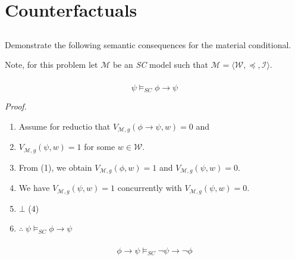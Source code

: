 \documentclass{article}
\begin{document}
    \section{Counterfactuals}
    
        \subsection{}
        \begin{task}
            Demonstrate the following semantic consequences for the material conditional.
        \end{task}

        Note, for this problem let $\mathscr{M}$ be an \textit{SC} model such that $\mathscr{M} = \langle \mathscr{W}, \preceq , \mathscr{I} \rangle$.


            \subsubsection{}
            $$\psi \vDash_{SC} \phi \rightarrow \psi$$

            \textit{Proof.}
            \begin{enumerate}
                \item Assume for reductio that $V_{\mathscr{M}, g}(\phi \rightarrow \psi, w) = 0$ and
                \item $V_{\mathscr{M}, g}(\psi, w) = 1$ for some $w \in \mathscr{W}$.
                \item From (1), we obtain $V_{\mathscr{M}, g}(\phi, w) = 1$ and $V_{\mathscr{M}, g}(\psi, w) = 0$.
                \item We have $V_{\mathscr{M}, g}(\psi, w) = 1$ concurrently with $V_{\mathscr{M}, g}(\psi, w) = 0$. 
                \item $\bot$ (4)
                \item $\therefore \; \psi \vDash_{SC} \phi \rightarrow \psi$
            \end{enumerate}

            \subsubsection{}
            $$\phi \rightarrow \psi \vDash_{SC} \lnot \psi \rightarrow \lnot \phi$$
\end{document}
